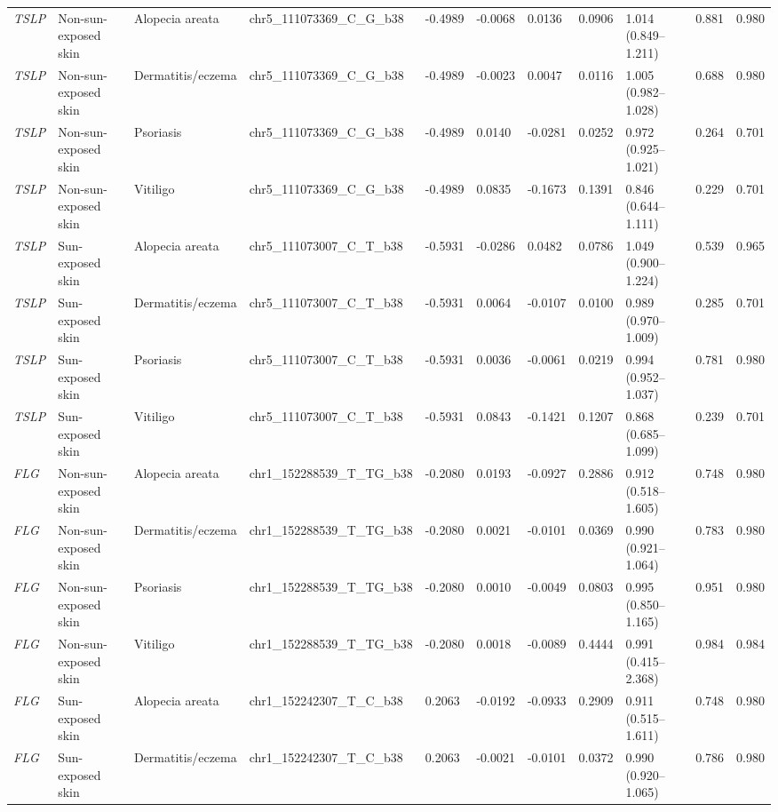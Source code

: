 \documentclass[10pt,a4paper]{article}
\begin{document}
\begin{landscape}
\begin{longtable}{p{1.5cm}p{2.7cm}p{2.5cm}p{4.2cm}p{1.5cm}p{1.5cm}p{1.5cm}p{1.4cm}p{3.4cm}p{1.8cm}p{1.8cm}}
\textit{TSLP} & Non-sun-exposed skin & Alopecia areata & chr5\_111073369\_C\_G\_b38 & -0.4989 & -0.0068 & 0.0136 & 0.0906 & 1.014 (0.849--1.211) & 0.881 & 0.980 \\
\textit{TSLP} & Non-sun-exposed skin & Dermatitis/eczema & chr5\_111073369\_C\_G\_b38 & -0.4989 & -0.0023 & 0.0047 & 0.0116 & 1.005 (0.982--1.028) & 0.688 & 0.980 \\
\textit{TSLP} & Non-sun-exposed skin & Psoriasis & chr5\_111073369\_C\_G\_b38 & -0.4989 & 0.0140 & -0.0281 & 0.0252 & 0.972 (0.925--1.021) & 0.264 & 0.701 \\
\textit{TSLP} & Non-sun-exposed skin & Vitiligo & chr5\_111073369\_C\_G\_b38 & -0.4989 & 0.0835 & -0.1673 & 0.1391 & 0.846 (0.644--1.111) & 0.229 & 0.701 \\
\textit{TSLP} & Sun-exposed skin & Alopecia areata & chr5\_111073007\_C\_T\_b38 & -0.5931 & -0.0286 & 0.0482 & 0.0786 & 1.049 (0.900--1.224) & 0.539 & 0.965 \\
\textit{TSLP} & Sun-exposed skin & Dermatitis/eczema & chr5\_111073007\_C\_T\_b38 & -0.5931 & 0.0064 & -0.0107 & 0.0100 & 0.989 (0.970--1.009) & 0.285 & 0.701 \\
\textit{TSLP} & Sun-exposed skin & Psoriasis & chr5\_111073007\_C\_T\_b38 & -0.5931 & 0.0036 & -0.0061 & 0.0219 & 0.994 (0.952--1.037) & 0.781 & 0.980 \\
\textit{TSLP} & Sun-exposed skin & Vitiligo & chr5\_111073007\_C\_T\_b38 & -0.5931 & 0.0843 & -0.1421 & 0.1207 & 0.868 (0.685--1.099) & 0.239 & 0.701 \\
\textit{FLG} & Non-sun-exposed skin & Alopecia areata & chr1\_152288539\_T\_TG\_b38 & -0.2080 & 0.0193 & -0.0927 & 0.2886 & 0.912 (0.518--1.605) & 0.748 & 0.980 \\
\textit{FLG} & Non-sun-exposed skin & Dermatitis/eczema & chr1\_152288539\_T\_TG\_b38 & -0.2080 & 0.0021 & -0.0101 & 0.0369 & 0.990 (0.921--1.064) & 0.783 & 0.980 \\
\textit{FLG} & Non-sun-exposed skin & Psoriasis & chr1\_152288539\_T\_TG\_b38 & -0.2080 & 0.0010 & -0.0049 & 0.0803 & 0.995 (0.850--1.165) & 0.951 & 0.980 \\
\textit{FLG} & Non-sun-exposed skin & Vitiligo & chr1\_152288539\_T\_TG\_b38 & -0.2080 & 0.0018 & -0.0089 & 0.4444 & 0.991 (0.415--2.368) & 0.984 & 0.984 \\
\textit{FLG} & Sun-exposed skin & Alopecia areata & chr1\_152242307\_T\_C\_b38 & 0.2063 & -0.0192 & -0.0933 & 0.2909 & 0.911 (0.515--1.611) & 0.748 & 0.980 \\
\textit{FLG} & Sun-exposed skin & Dermatitis/eczema & chr1\_152242307\_T\_C\_b38 & 0.2063 & -0.0021 & -0.0101 & 0.0372 & 0.990 (0.920--1.065) & 0.786 & 0.980 \\

\end{longtable}
\end{landscape}
\end{document}
